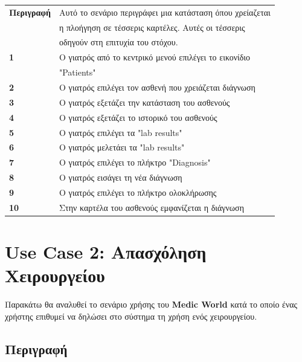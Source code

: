\documentclass{article}
\newcommand\T{\rule{0pt}{2.6ex}}       %
\newcommand\B{\rule[-1.2ex]{0pt}{0pt}}
\begin{document}
 \begin{center}
     \begin{tabular}{|l|l|}
     \hline
      \textbf{Περιγραφή }   & Αυτό το σενάριο περιγράφει μια κατάσταση όπου χρείαζεται\\& η πλοήγηση σε τέσσερις καρτέλες. Αυτές οι τέσσερις\\& οδηγούν στη επιτυχία του στόχου. \T\B \\ 
      \hline
      \textbf{1} & Ο γιατρός από το κεντρικό μενού επιλέγει το εικονίδιο\\& "Patients" \T\B \\
      \hline
      \textbf{2} & Ο γιατρός επιλέγει τον ασθενή που χρειάζεται διάγνωση\T\B \\
      \hline
      \textbf{3} & Ο γιατρός εξετάζει την κατάσταση του ασθενούς \T\B \\
      \hline
      \textbf{4} & Ο γιατρός εξετάζει το ιστορικό του ασθενούς \T\B \\
      \hline
      \textbf{5} & Ο γιατρός επιλέγει τα "lab results" \T\B \\
      \hline
      \textbf{6} & Ο γιατρός μελετάει τα "lab results" \T\B \\
      \hline
      \textbf{7} & Ο γιατρός επιλέγει το πλήκτρο "Diagnosis" \T\B \\
      \hline
      \textbf{8} & Ο γιατρός εισάγει τη νέα διάγνωση \T\B \\
      \hline
      \textbf{9} & Ο γιατρός επιλέγει το πλήκτρο ολοκλήρωσης \T\B \\
      \hline
      \textbf{10} & Στην καρτέλα του ασθενούς εμφανίζεται η διάγνωση \T\B \\
      \hline
     \end{tabular}
 \end{center}
 

 
 \section{Use Case 2: Απασχόληση Χειρουργείου}
 
 Παρακάτω θα αναλυθεί το σενάριο χρήσης του \textbf{Medic World} κατά το οποίο ένας χρήστης επιθυμεί να δηλώσει στο σύστημα τη χρήση ενός χειρουργείου.

\subsection{Περιγραφή}
\end{document}
